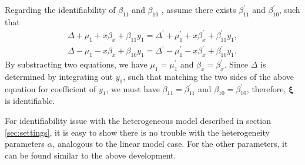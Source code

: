 \documentclass[12pt]{article}
\begin{document}
Regarding the identifiability of $\beta_{11}$ and $\beta_{10}$ ,
assume there exists $\beta_{11}^{'}$ and $\beta_{10}^{'}$, such that
\begin{align*}
  \Delta + \mu_1 + x\beta_x + \beta_{11}y_1 = \Delta^{'} + \mu_1^{'} + x\beta_{x}^{'} + \beta_{11}^{'}y_1, \\
  \Delta - \mu_1 - x\beta_x + \beta_{10}y_1 = \Delta^{'} - \mu_1^{'} -
  x\beta_{x}^{'} + \beta_{10}^{'}y_1.
\end{align*}
By substracting two equations, we have $\mu_1 = \mu_1^{'}$ and
$\beta_x = \beta_x^{'}$. Since $\Delta$ is determined by integrating
out $y_1$, such that matching the two sides of the above equation for
coefficient of $y_1$, we must have $\beta_{11} = \beta_{11}^{'}$ and
$\beta_{10} = \beta_{10}^{'}$, therefore, $\bm \xi$ is identifiable.

For identifiability issue with the heterogeneous model described in
section \ref{sec:settings}, it is easy to show there is no trouble
with the heterogeneity parameters $\alpha$, analogous to the linear
model case. For the other parameters, it can be found similar to the
above development.
\end{document}
